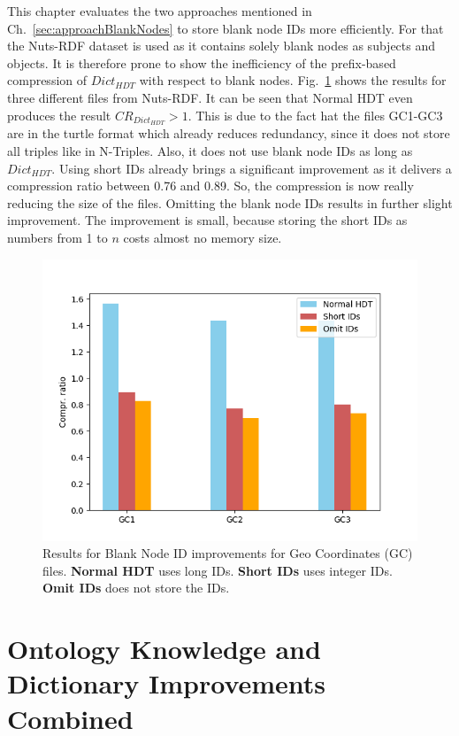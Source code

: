 This chapter evaluates the two approaches mentioned in Ch.~\ref{sec:approachBlankNodes} to store blank node IDs more efficiently. For that the Nuts-RDF dataset is used as it contains solely blank nodes as subjects and objects. It is therefore prone to show the inefficiency of the prefix-based compression of $Dict_{HDT}$ with respect to blank nodes. Fig.~\ref{fig:blanknodes} shows the results for three different files from Nuts-RDF. It can be seen that Normal HDT even produces the result $CR_{Dict_{HDT}}>1$. This is due to the fact hat the files GC1-GC3 are in the turtle format which already reduces redundancy, since it does not store all triples like in N-Triples. Also, it does not use blank node IDs as long as $Dict_{HDT}$. Using short IDs already brings a significant improvement as it delivers a compression ratio between 0.76 and 0.89. So, the compression is now really reducing the size of the files. Omitting the blank node IDs results in further slight improvement. The improvement is small, because storing the short IDs as numbers from 1 to $n$ costs almost no memory size.


\begin{figure}
	\centering
	\includegraphics[width=0.7\linewidth]{figures/4_evaluation/blankNodes}
	\caption{Results for Blank Node ID improvements for Geo Coordinates (GC) files. \textbf{Normal HDT} uses long IDs. \textbf{Short IDs} uses integer IDs. \textbf{Omit IDs} does not store the IDs.}
	\label{fig:blanknodes}
\end{figure}


\section{Ontology Knowledge and Dictionary Improvements Combined}






























